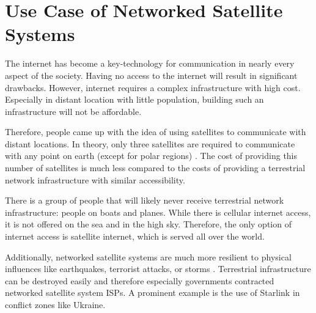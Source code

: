 \section{Use Case of Networked Satellite Systems} \label{sec:usecase-networked-satellite-systems}

The internet has become a key-technology for communication in nearly every
aspect of the society. Having no access to the internet will result in
significant drawbacks. However, internet requires a complex infrastructure with
high cost. Especially in distant location with little population, building such
an infrastructure will not be affordable.

Therefore, people came up with the idea of using satellites to communicate with
distant locations. In theory, only three satellites are required to communicate
with any point on earth (except for polar regions)
\cite{DBLP:conf/5gwf/HofmannK19}. The cost of providing this number of
satellites is much less compared to the costs of providing a terrestrial
network infrastructure with similar accessibility.

There is a group of people that will likely never receive terrestrial network
infrastructure: people on boats and planes. While there is cellular internet
access, it is not offered on the sea and in the high sky. Therefore, the only
option of internet access is satellite internet, which is served all over the
world.

Additionally, networked satellite systems are much more resilient to physical
influences like earthquakes, terrorist attacks, or storms
\cite{DBLP:conf/pam/StevensIBD24}. Terrestrial infrastructure can be destroyed
easily and therefore especially governments contracted networked satellite
system ISPs. A prominent example is the use of Starlink in conflict zones like
Ukraine.
